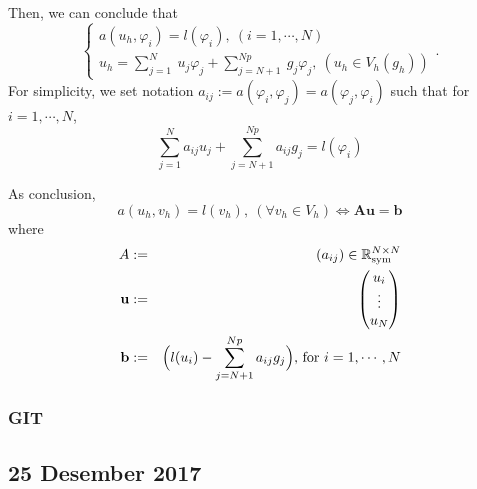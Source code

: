 \documentclass[a4paper,10pt]{article}
\begin{document}
Then, we can conclude that
\begin{equation*} 
\begin{cases}
a(u_h, \varphi_i) = l(\varphi_i), \ (i=1, \cdots , N)\\
u_h = \sum_{j=1}^{N} \ u_j \varphi_j + \sum_{j=N+1}^{Np} \ g_j \varphi_j, \ (u_h \in V_h (g_h))
\end{cases}.
\end{equation*}
For simplicity, we set notation $ a_{ij} := a(\varphi_i, \varphi_j) = a(\varphi_j, \varphi_i)$ such that for $  i=1, \cdots , N $,
\[\sum_{j=1}^{N} a_{ij} u_{j} + \sum_{j=N+1}^{Np} a_{ij} g_j = l(\varphi_i)\]

As conclusion, 
\[ a(u_h , v_h)=l(v_h), \ (\forall v_h \in V_h) \Leftrightarrow \mathbf{A} \mathbf{u} = \mathbf{b} \]
where
\begin{eqnarray}\nonumber
A &:=& (a_{ij}) \in \mathbb{R}_{\text{sym}}^{N \times N}\\ \nonumber
\text{\textbf{u}} &:=& \begin{pmatrix}
u_i \\ \vdots \\ u_{N}
\end{pmatrix}\\ \nonumber
\text{\textbf{b}} &:=& \Big(l(u_i) - \sum_{j=N+1}^{Np} a_{ij} g_j\Big) \text{, for }{i=1, \cdots , N}
\end{eqnarray}

\subsubsection{GIT}

\subsection{25 Desember 2017}
\end{document}
